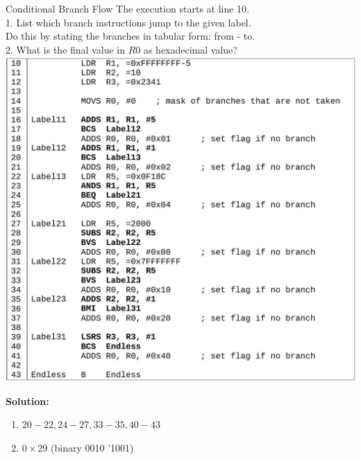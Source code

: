 \begin{example2}{Conditional Branch Flow}
The execution starts at line 10.
\vspace{2mm}\\
1. List which branch instructions jump to the given label.\\
Do this by stating the branches in tabular form: from - to.
\vspace{2mm}\\
2. What is the final value in $R 0$ as hexadecimal value?
\vspace{2mm}\\
\includegraphics[width=\linewidth]{images/2025_01_02_9902c2d2685de638ef73g-3}


\textbf{Solution:}
\begin{enumerate}
  \item $20-22,24-27,33-35,40-43$
  \item $0 \times 29$ (binary 0010 '1001)
\end{enumerate}
\end{example2}




